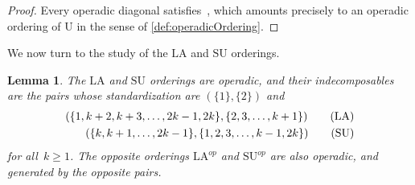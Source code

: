 \documentclass{amsart}
\newtheorem{lemma}[theorem]{Lemma}
\theoremstyle{definition}
\newcommand{\Un}{\mathrm{U}} %
\newcommand{\SU}{\mathrm{SU}}
\newcommand{\LA}{\mathrm{LA}}
\begin{document}
\begin{proof}
Every operadic diagonal satisfies~\cite[Prop.~4.14]{LaplanteAnfossi}, which amounts precisely to an operadic ordering of $\Un$ in the sense of \cref{def:operadicOrdering}.
\end{proof}

We now turn to the study of the $\LA$ and $\SU$ orderings.

\begin{lemma} 
\label{lem:operadic-ordering}
The $\LA$ and $\SU$ orderings are operadic, and their indecomposables are the pairs whose standardization are $(\{1\},\{2\})$ and
\begin{align}
(\{1,k+2,k+3,\dots,2k-1,2k\}, \{2,3,\dots,k+1\}) \tag{$\LA$} \label{eq:std-LA} \\
(\{k,k+1,\dots,2k-1\},\{1,2,3,\dots,k-1,2k\}) \tag{$\SU$}
\end{align} 
for all~$k\geq 1$. 
The opposite orderings $\LA^{op}$ and $\SU^{op}$ are also operadic, and generated by the opposite pairs.
\end{lemma}
\end{document}
